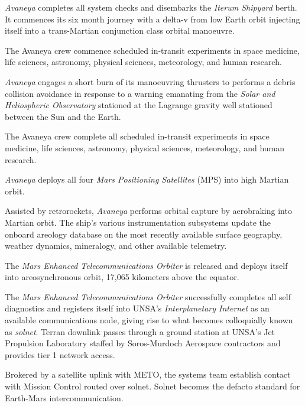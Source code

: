 {\it Avaneya} completes all system checks and disembarks the {\it Iterum Shipyard} berth. It commences its six month journey with a delta-v from low Earth orbit injecting itself into a trans-Martian conjunction class orbital manoeuvre.
\StopTimelineDate

The Avaneya crew commence scheduled in-transit experiments in space medicine, life sciences, astronomy, physical sciences, meteorology, and human research.
\StopTimelineDate

{\it Avaneya} engages a short burn of its manoeuvring thrusters to performs a debris collision avoidance in response to a warning emanating from the {\it Solar and Heliospheric Observatory} stationed at the Lagrange  gravity well stationed between the Sun and the Earth.
\StopTimelineDate

The Avaneya crew complete all scheduled in-transit experiments in space medicine, life sciences, astronomy, physical sciences, meteorology, and human research.
\StopTimelineDate

{\it Avaneya} deploys all four {\it Mars Positioning Satellites} (MPS) into high Martian orbit.
\StopTimelineDate

Assisted by retrorockets, {\it Avaneya} performs orbital capture by aerobraking into Martian orbit. The ship's various instrumentation subsystems update the onboard areology database on the most recently available surface geography, weather dynamics, mineralogy, and other available telemetry.

The {\it Mars Enhanced Telecommunications Orbiter} is released and deploys itself into areosynchronous orbit, 17,065 kilometers above the equator.

The {\it Mars Enhanced Telecommunications Orbiter} successfully completes all self diagnostics and registers itself into UNSA's {\it Interplanetary Internet} as an available communications node, giving rise to what becomes colloquially known as {\it solnet}. Terran downlink passes through a ground station at UNSA's Jet Propulsion Laboratory staffed by Soros-Murdoch Aerospace contractors and provides tier 1 network access.

Brokered by a satellite uplink with METO, the systems team establish contact with Mission Control routed over solnet. Solnet becomes the defacto standard for Earth-Mars intercommunication.
\StopTimelineDate

